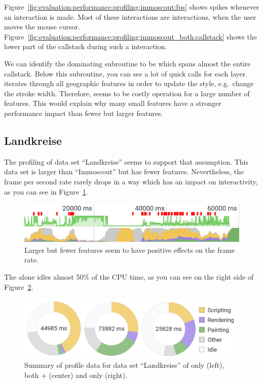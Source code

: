 Figure~\ref{fig:evaluation:performance:profiling:immoscout:fps} shows spikes whenever an interaction is made.
Most of these interactions are  interactions, when the user moves the mouse cursor.
Figure~\ref{fig:evaluation:performance:profiling:immoscout_both:callstack} shows the lower part of the callstack during such a  interaction.

We can identify the dominating subroutine to be  which spans almost the entire callstack.
Below this subroutine, you can see a lot of quick calls for each layer.
 iterates through all geographic features in order to update the style, e.g.\ change the stroke width.
Therefore,  seems to be costly operation for a large number of features.
This would explain why many small features have a stronger performance impact than fewer but larger features.


\subsection{Landkreise}
The profiling of data set ``Landkreise'' seems to support that assumption.
This data set is larger than ``Immoscout'' but has fewer features.
Nevertheless, the frame per second rate rarely drops in a way which has an impact on interactivity, as you can see in Figure~\ref{fig:evaluation:performance:profiling:landkreise_both:fps}.


\begin{figure}[ht]
  \centering
  \caption{
    Larger but fewer features seem to have positive effects on the frame rate.
  }\label{fig:evaluation:performance:profiling:landkreise_both:fps}
  \includegraphics[width=\textwidth]{figures/evaluation/performance/profiles/landkreise_both/fps}
\end{figure}

The \gv{} alone idles almost 50\% of the CPU time, as you can see on the right side of Figure~\ref{fig:evaluation:performance:profiling:landkreise:summary}.
\begin{figure}[ht]
  \centering
  \includegraphics[width=\textwidth]{figures/evaluation/performance/summaries/landkreise}
  \caption{
    Summary of profile data for data set ``Landkreise'' of \tmap{} only (left), both \tmap{} + \gv{} (center) and only \gv{} (right).
  }\label{fig:evaluation:performance:profiling:landkreise:summary}
\end{figure}



